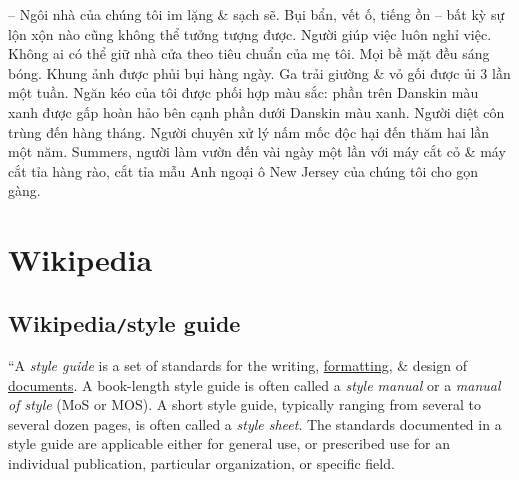 \documentclass{article}
\begin{document}
\begin{itemize}
	-- Ngôi nhà của chúng tôi im lặng \& sạch sẽ. Bụi bẩn, vết ố, tiếng ồn -- bất kỳ sự lộn xộn nào cũng không thể tưởng tượng được. Người giúp việc luôn nghỉ việc. Không ai có thể giữ nhà cửa theo tiêu chuẩn của mẹ tôi. Mọi bề mặt đều sáng bóng. Khung ảnh được phủi bụi hàng ngày. Ga trải giường \& vỏ gối được ủi 3 lần một tuần. Ngăn kéo của tôi được phối hợp màu sắc: phần trên Danskin màu xanh được gấp hoàn hảo bên cạnh phần dưới Danskin màu xanh. Người diệt côn trùng đến hàng tháng. Người chuyên xử lý nấm mốc độc hại đến thăm hai lần một năm. Summers, người làm vườn đến vài ngày một lần với máy cắt cỏ \& máy cắt tỉa hàng rào, cắt tỉa mẫu Anh ngoại ô New Jersey của chúng tôi cho gọn gàng.
\end{itemize}






\section{Wikipedia}

\subsection{Wikipedia{\tt/}style guide}
``A {\it style guide} is a set of standards for the writing, \href{https://en.wikipedia.org/wiki/Typesetting}{formatting}, \& design of \href{https://en.wikipedia.org/wiki/Document}{documents}. A book-length style guide is often called a {\it style manual} or a {\it manual of style} (MoS or MOS). A short style guide, typically ranging from several to several dozen pages, is often called a {\it style sheet}. The standards documented in a style guide are applicable either for general use, or prescribed use for an individual publication, particular organization, or specific field.
\end{document}
